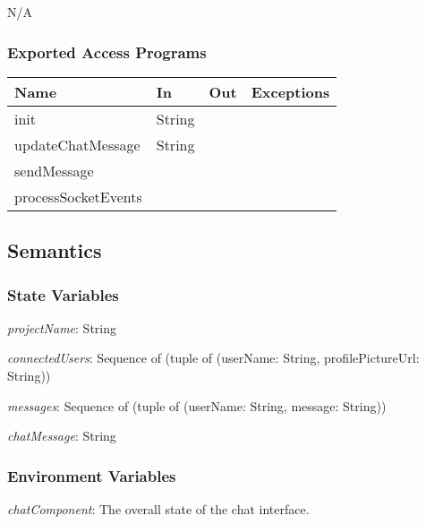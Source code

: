 \documentclass[12pt, titlepage]{article}
\begin{document}
	N/A
	
	\subsubsection{Exported Access Programs}
	
	\begin{center}
		\begin{tabular}{l  l  l  l}
			\hline
			\textbf{Name} & \textbf{In} & \textbf{Out} & \textbf{Exceptions} \\
			\hline
			init & String & & \\
			updateChatMessage & String & & \\
			sendMessage & & & \\
			processSocketEvents & & & \\
			\hline
		\end{tabular}
	\end{center}
	
	\subsection{Semantics}
	
	\subsubsection{State Variables}
	
	\textit{projectName}: String
	
	\noindent \textit{connectedUsers}: Sequence of (tuple of (userName: String, profilePictureUrl: String))
	
	\noindent \textit{messages}: Sequence of (tuple of (userName: String, message: String))
	
	\noindent \textit{chatMessage}: String
	
	\subsubsection{Environment Variables}
	
	\noindent \textit{chatComponent}: The overall state of the chat interface.\\
	
	
\end{document}
